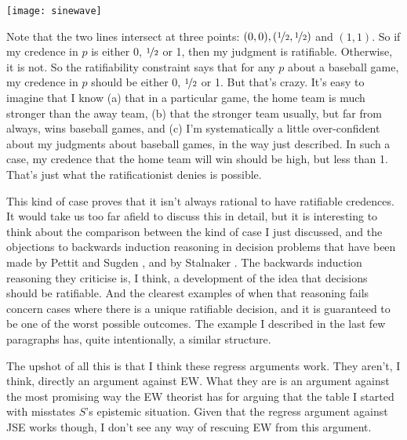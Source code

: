 \begin{center}
\texttt{[image: sinewave]}
\end{center}

\noindent Note that the two lines intersect at three points: \((0, 0), (\nicefrac{1}{2}, \nicefrac{1}{2})\) and \((1, 1)\). So if my credence in \(p\) is either 0, \(\nicefrac{1}{2}\) or 1, then my judgment is ratifiable. Otherwise, it is not. So the ratifiability constraint says that for any \(p\) about a baseball game, my credence in \(p\) should be either 0, \(\nicefrac{1}{2}\) or 1. But that's crazy. It's easy to imagine that I know (a) that in a particular game, the home team is much stronger than the away team, (b) that the stronger team usually, but far from always, wins baseball games, and (c) I'm systematically a little over-confident about my judgments about baseball games, in the way just described. In such a case, my credence that the home team will win should be high, but less than 1. That's just what the ratificationist denies is possible.

This kind of case proves that it isn't always rational to have ratifiable credences. It would take us too far afield to discuss this in detail, but it is interesting to think about the comparison between the kind of case I just discussed, and the objections to backwards induction reasoning in decision problems that have been made by Pettit and Sugden \citeyearpar{Pettit1989-PETTBI}, and by Stalnaker \citeyearpar{Stalnaker1996, Stalnaker1998}. The backwards induction reasoning they criticise is, I think, a development of the idea that decisions should be ratifiable. And the clearest examples of when that reasoning fails concern cases where there is a unique ratifiable decision, and it is guaranteed to be one of the worst possible outcomes. The example I described in the last few paragraphs has, quite intentionally, a similar structure.

The upshot of all this is that I think these regress arguments work. They aren't, I think, directly an argument against EW. What they are is an argument against the most promising way the EW theorist has for arguing that the table I started with misstates $S$'s epistemic situation. Given that the regress argument against JSE works though, I don't see any way of rescuing EW from this argument.
